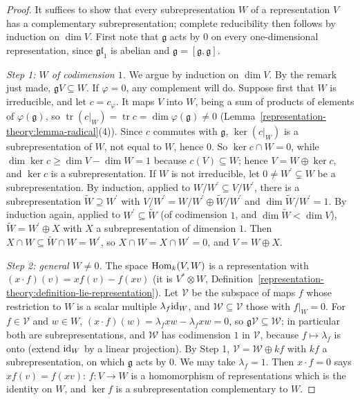\begin{proof}
It suffices to show that every subrepresentation $W$ of a representation $V$ has a complementary subrepresentation; complete reducibility then follows by induction on $\dim V$. First
note that $\mathfrak{g}$ acts by $0$ on every one-dimensional representation, since $\mathfrak{gl}_1$ is abelian and $\mathfrak{g} = [\mathfrak{g}, \mathfrak{g}]$.

\emph{Step 1: $W$ of codimension $1$.} We argue by induction on $\dim V$. By the remark just made, $\mathfrak{g}V \subseteq W$. If $\varphi = 0$, any complement will do. Suppose first
that $W$ is irreducible, and let $c = c_\varphi$. It maps $V$ into $W$, being a sum of products of elements of $\varphi(\mathfrak{g})$, so
$\operatorname{tr}(c|_W) = \operatorname{tr}c = \dim\varphi(\mathfrak{g}) \neq 0$ (Lemma~\ref{representation-theory:lemma-radical}(4)). Since $c$ commutes with $\mathfrak{g}$,
$\ker(c|_W)$ is a subrepresentation of $W$, not equal to $W$, hence $0$. So $\ker c \cap W = 0$, while $\dim\ker c \geq \dim V - \dim W = 1$ because $c(V) \subseteq W$; hence
$V = W \oplus \ker c$, and $\ker c$ is a subrepresentation. If $W$ is not irreducible, let $0 \neq W^{\prime} \subsetneq W$ be a subrepresentation. By induction, applied to
$W/W^{\prime} \subseteq V/W^{\prime}$, there is a subrepresentation $\widetilde{W} \supseteq W^{\prime}$ with $V/W^{\prime} = W/W^{\prime} \oplus \widetilde{W}/W^{\prime}$ and
$\dim\widetilde{W}/W^{\prime} = 1$. By induction again, applied to $W^{\prime} \subseteq \widetilde{W}$ (of codimension $1$, and $\dim\widetilde{W} < \dim V$),
$\widetilde{W} = W^{\prime} \oplus X$ with $X$ a subrepresentation of dimension $1$. Then $X \cap W \subseteq \widetilde{W} \cap W = W^{\prime}$, so $X \cap W = X \cap W^{\prime} = 0$,
and $V = W \oplus X$.

\emph{Step 2: general $W \neq 0$.} The space $\operatorname{Hom}_k(V, W)$ is a representation with $(x \cdot f)(v) = xf(v) - f(xv)$ (it is $V^* \otimes W$,
Definition~\ref{representation-theory:definition-lie-representation}). Let $\mathcal{V}$ be the subspace of maps $f$ whose restriction to $W$ is a scalar multiple $\lambda_f\mathrm{id}_W$,
and $\mathcal{W} \subseteq \mathcal{V}$ those with $f|_W = 0$. For $f \in \mathcal{V}$ and $w \in W$, $(x \cdot f)(w) = \lambda_fxw - \lambda_fxw = 0$, so
$\mathfrak{g}\mathcal{V} \subseteq \mathcal{W}$; in particular both are subrepresentations, and $\mathcal{W}$ has codimension $1$ in $\mathcal{V}$, because $f \mapsto \lambda_f$ is onto
(extend $\mathrm{id}_W$ by a linear projection). By Step 1, $\mathcal{V} = \mathcal{W} \oplus kf$ with $kf$ a subrepresentation, on which $\mathfrak{g}$ acts by $0$. We may take
$\lambda_f = 1$. Then $x \cdot f = 0$ says $xf(v) = f(xv)$: $f \colon V \to W$ is a homomorphism of representations which is the identity on $W$, and $\ker f$ is a
subrepresentation complementary to $W$.
\end{proof}

